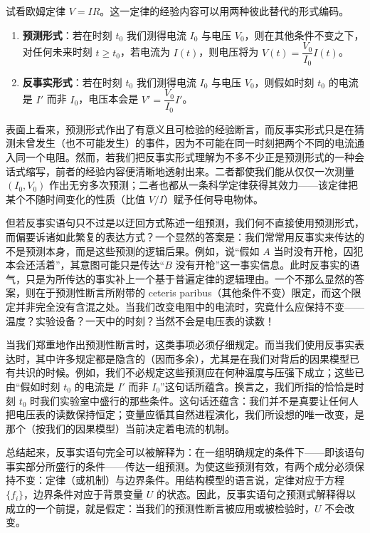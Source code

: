试看欧姆定律 $V=IR$。这一定律的经验内容可以用两种彼此替代的形式编码。
\begin{enumerate}[label=\arabic*.,leftmargin=1.9em,itemsep=0.35em]
\item \textbf{预测形式}：若在时刻 $t_0$ 我们测得电流 $I_0$ 与电压 $V_0$，则在其他条件不变之下，对任何未来时刻 $t\ge t_0$，若电流为 $I(t)$，则电压将为 $V(t)=\dfrac{V_0}{I_0}I(t)$。
\item \textbf{反事实形式}：若在时刻 $t_0$ 我们测得电流 $I_0$ 与电压 $V_0$，则假如时刻 $t_0$ 的电流是 $I'$ 而非 $I_0$，电压本会是 $V'=\dfrac{V_0}{I_0}I'$。
\end{enumerate}
表面上看来，预测形式作出了有意义且可检验的经验断言，而反事实形式只是在猜测未曾发生（也不可能发生）的事件，因为不可能在同一时刻把两个不同的电流通入同一个电阻。然而，若我们把反事实形式理解为不多不少正是预测形式的一种会话式缩写，前者的经验内容便清晰地透射出来。二者都使我们能从仅仅一次测量 $(I_0,V_0)$ 作出无穷多次预测；二者也都从一条科学定律获得其效力——该定律把某个不随时间变化的性质（比值 $V/I$）赋予任何导电物体。

但若反事实语句只不过是以迂回方式陈述一组预测，我们何不直接使用预测形式，而偏要诉诸如此繁复的表达方式？一个显然的答案是：我们常常用反事实来传达的不是预测本身，而是这些预测的逻辑后果。例如，说“假如 $A$ 当时没有开枪，囚犯本会还活着”，其意图可能只是传达“$B$ 没有开枪”这一事实信息。此时反事实的语气，只是为所传达的事实补上一个基于普遍定律的逻辑理由。一个不那么显然的答案，则在于预测性断言所附带的 ceteris paribus（其他条件不变）限定，而这个限定并非完全没有含混之处。当我们改变电阻中的电流时，究竟什么应保持不变——温度？实验设备？一天中的时刻？当然不会是电压表的读数！

当我们郑重地作出预测性断言时，这类事项必须仔细规定。而当我们使用反事实表达时，其中许多规定都是隐含的（因而多余），尤其是在我们对背后的因果模型已有共识的时候。例如，我们不必规定这些预测应在何种温度与压强下成立；这些已由“假如时刻 $t_0$ 的电流是 $I'$ 而非 $I_0$”这句话所蕴含。换言之，我们所指的恰恰是时刻 $t_0$ 时我们实验室中盛行的那些条件。这句话还蕴含：我们并不是真要让任何人把电压表的读数保持恒定；变量应循其自然进程演化，我们所设想的唯一改变，是那个（按我们的因果模型）当前决定着电流的机制。

总结起来，反事实语句完全可以被解释为：在一组明确规定的条件下——即该语句事实部分所盛行的条件——传达一组预测。为使这些预测有效，有两个成分必须保持不变：定律（或机制）与边界条件。用结构模型的语言说，定律对应于方程 $\{f_i\}$，边界条件对应于背景变量 $U$ 的状态。因此，反事实语句之预测式解释得以成立的一个前提，就是假定：当我们的预测性断言被应用或被检验时，$U$ 不会改变。

